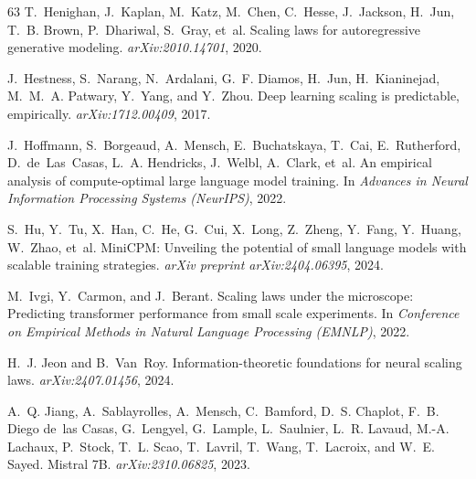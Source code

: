 \documentclass{article}
\theoremstyle{plain}
\theoremstyle{definition}
\theoremstyle{remark}
\begin{document}
\begin{thebibliography}{63}
T.~Henighan, J.~Kaplan, M.~Katz, M.~Chen, C.~Hesse, J.~Jackson, H.~Jun, T.~B. Brown, P.~Dhariwal, S.~Gray, et~al.
\newblock Scaling laws for autoregressive generative modeling.
\newblock \emph{arXiv:2010.14701}, 2020.

J.~Hestness, S.~Narang, N.~Ardalani, G.~F. Diamos, H.~Jun, H.~Kianinejad, M.~M.~A. Patwary, Y.~Yang, and Y.~Zhou.
\newblock Deep learning scaling is predictable, empirically.
\newblock \emph{arXiv:1712.00409}, 2017.

J.~Hoffmann, S.~Borgeaud, A.~Mensch, E.~Buchatskaya, T.~Cai, E.~Rutherford, D.~de~Las~Casas, L.~A. Hendricks, J.~Welbl, A.~Clark, et~al.
\newblock An empirical analysis of compute-optimal large language model training.
\newblock In \emph{Advances in Neural Information Processing Systems (NeurIPS)}, 2022.

S.~Hu, Y.~Tu, X.~Han, C.~He, G.~Cui, X.~Long, Z.~Zheng, Y.~Fang, Y.~Huang, W.~Zhao, et~al.
\newblock Mini{CPM}: Unveiling the potential of small language models with scalable training strategies.
\newblock \emph{arXiv preprint arXiv:2404.06395}, 2024.

M.~Ivgi, Y.~Carmon, and J.~Berant.
\newblock Scaling laws under the microscope: Predicting transformer performance from small scale experiments.
\newblock In \emph{Conference on Empirical Methods in Natural Language Processing (EMNLP)}, 2022.

H.~J. Jeon and B.~Van~Roy.
\newblock Information-theoretic foundations for neural scaling laws.
\newblock \emph{arXiv:2407.01456}, 2024.

A.~Q. Jiang, A.~Sablayrolles, A.~Mensch, C.~Bamford, D.~S. Chaplot, F.~B. Diego de~las Casas, G.~Lengyel, G.~Lample, L.~Saulnier, L.~R. Lavaud, M.-A. Lachaux, P.~Stock, T.~L. Scao, T.~Lavril, T.~Wang, T.~Lacroix, and W.~E. Sayed.
\newblock Mistral 7{B}.
\newblock \emph{arXiv:2310.06825}, 2023.


\end{thebibliography}
\end{document}
